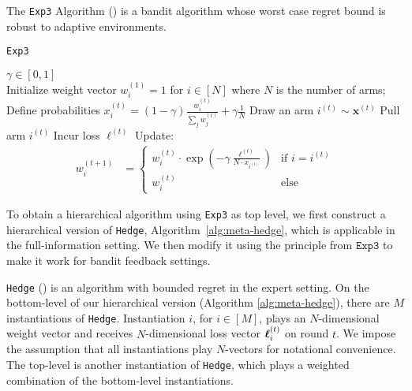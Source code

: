 The \texttt{Exp3} Algorithm (\cite{auer:02b}) is a bandit algorithm whose worst case regret bound is robust to adaptive environments.

\begin{algorithm}
   \caption{\texttt{Exp3}}
   \label{alg:exp3}
   \begin{algorithmic}   
       $\gamma\in[0,1]$\\
   \STATE Initialize weight vector $w^{(1)}_{i}=1$ for $i\in[N]$ where $N$ is the number of arms;
	   \STATE Define probabilities $x_i^{(t)} = (1-\gamma)\frac{w_i^{(t)}}{ \sum_j w_{j}^{(t)} } + \gamma\frac{1}{N}$
	   \STATE Draw an arm $i^{(t)} \sim\mathbf{x}^{(t)}$
	\STATE Pull arm $i^{(t)} $
	   \STATE Incur loss $\ell^{(t)}$
	   \STATE Update:
	   \begin{align}
		w^{(t+1)}_i & = \begin{cases}
		   w_{i}^{(t)} \cdot \exp(-\gamma \frac{\ell^{(t)}}{N\cdot x_{i^{(t)}}})
			 & \text{if } i=i^{(t)} \\
			w^{(t)}_{i} & \text{else}
		\end{cases}		
		\end{align}
    \ENDFOR
       	\end{algorithmic}
\end{algorithm}         
 
To obtain a hierarchical algorithm using \texttt{Exp3} as top level, we first construct a hierarchical version of \texttt{Hedge}, Algorithm~\ref{alg:meta-hedge}, which is applicable in the full-information setting. We then modify it using the principle from $\texttt{Exp3}$ to make it work for bandit feedback settings.

\texttt{Hedge} (\cite{chang:05}) is an algorithm with bounded regret in the expert setting.
On the bottom-level of our hierarchical version (Algorithm \ref{alg:meta-hedge}), there are $M$ instantiations of \texttt{Hedge}. Instantiation $i$, for $i\in[M]$, plays an $N$-dimensional weight vector and receives $N$-dimensional loss vector $\boldsymbol\ell^{(t)}_{i}$ on round $t$. We impose the assumption that all instantiations play $N$-vectors for notational convenience. The top-level is another instantiation of \texttt{Hedge}, which plays a weighted combination of the bottom-level instantiations.

